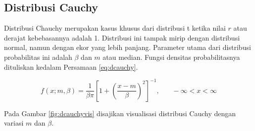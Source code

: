 \documentclass[]{book}
\begin{document}
\subsection{Distribusi Cauchy}\label{distribusi-cauchy}

Distribusi Chauchy merupakan kasus khusus dari distribusi t ketika nilai
\(r\) atau derajat kebebasannya adalah 1. Distribusi ini tampak mirip
dengan distribusi normal, namun dengan ekor yang lebih panjang.
Parameter utama dari distribusi probabilitas ini adalah \(\beta\) dan
\(m\) atau median. Fungsi densitas probabilitasnya dituliskan kedalam
Persamaan \eqref{eq:dcauchy}.

\begin{equation}
   f\left(x;m,\beta\right)=\frac{1}{\beta\pi}\left[1+\left(\frac{x-m}{\beta}\right)^2\right]^{-1},\ \ \ \ \ \ \ \ -\infty<x<\infty
  \label{eq:dcauchy}
\end{equation}

Pada Gambar \ref{fig:dcauchyvis} disajikan visualisasi distribusi Cauchy
dengan variasi \(m\) dan \(\beta\).
\end{document}
